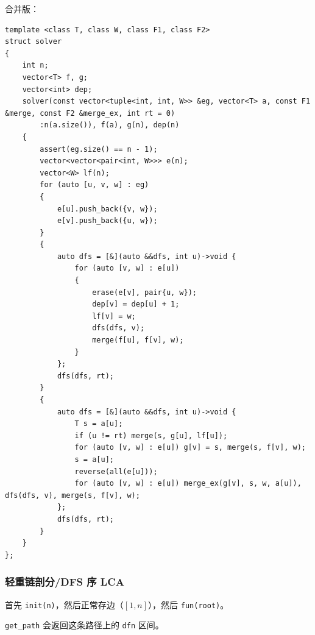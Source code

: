 \documentclass[12pt]{ctexart}
\begin{document}
合并版：

\begin{lstlisting}
template <class T, class W, class F1, class F2>
struct solver
{
	int n;
	vector<T> f, g;
	vector<int> dep;
	solver(const vector<tuple<int, int, W>> &eg, vector<T> a, const F1 &merge, const F2 &merge_ex, int rt = 0)
		:n(a.size()), f(a), g(n), dep(n)
	{
		assert(eg.size() == n - 1);
		vector<vector<pair<int, W>>> e(n);
		vector<W> lf(n);
		for (auto [u, v, w] : eg)
		{
			e[u].push_back({v, w});
			e[v].push_back({u, w});
		}
		{
			auto dfs = [&](auto &&dfs, int u)->void {
				for (auto [v, w] : e[u])
				{
					erase(e[v], pair{u, w});
					dep[v] = dep[u] + 1;
					lf[v] = w;
					dfs(dfs, v);
					merge(f[u], f[v], w);
				}
			};
			dfs(dfs, rt);
		}
		{
			auto dfs = [&](auto &&dfs, int u)->void {
				T s = a[u];
				if (u != rt) merge(s, g[u], lf[u]);
				for (auto [v, w] : e[u]) g[v] = s, merge(s, f[v], w);
				s = a[u];
				reverse(all(e[u]));
				for (auto [v, w] : e[u]) merge_ex(g[v], s, w, a[u]), dfs(dfs, v), merge(s, f[v], w);
			};
			dfs(dfs, rt);
		}
	}
};
\end{lstlisting}


\subsubsection{轻重链剖分/DFS 序 LCA}

首先 \verb|init(n)|，然后正常存边（$[1,n]$），然后 \verb|fun(root)|。

\verb|get_path| 会返回这条路径上的 \verb|dfn| 区间。
\end{document}
